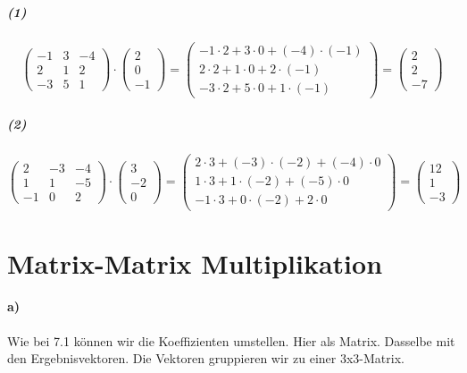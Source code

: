 \documentclass{article}
\begin{document}
\subparagraph{(1)}

$$ \begin{pmatrix} -1 & 3 & -4 \\ 2 & 1 & 2 \\ -3 & 5 & 1 \end{pmatrix} \cdot \begin{pmatrix} 2 \\ 0 \\ -1 \end{pmatrix} = \begin{pmatrix} -1 \cdot 2 + 3 \cdot 0 + (-4) \cdot (-1) \\ 2 \cdot 2 + 1 \cdot 0 + 2 \cdot (-1) \\ -3 \cdot 2 + 5 \cdot 0 + 1 \cdot (-1) \end{pmatrix} = \begin{pmatrix} 2 \\ 2 \\ -7 \end{pmatrix} $$

\subparagraph{(2)}

$$ \begin{pmatrix} 2 & -3 & -4 \\ 1 & 1 & -5 \\ -1 & 0 & 2 \end{pmatrix} \cdot \begin{pmatrix} 3 \\ -2 \\ 0 \end{pmatrix} = \begin{pmatrix} 2 \cdot 3 + (-3) \cdot (-2) + (-4) \cdot 0 \\ 1 \cdot 3 + 1 \cdot (-2) + (-5) \cdot 0 \\ -1 \cdot 3 + 0 \cdot (-2) + 2 \cdot 0 \end{pmatrix} = \begin{pmatrix} 12 \\ 1 \\ -3 \end{pmatrix} $$

\section{Matrix-Matrix Multiplikation}

\paragraph{a)}

Wie bei 7.1 können wir die Koeffizienten umstellen. Hier als Matrix. Dasselbe mit den Ergebnisvektoren. Die Vektoren gruppieren wir zu einer 3x3-Matrix.
\end{document}
